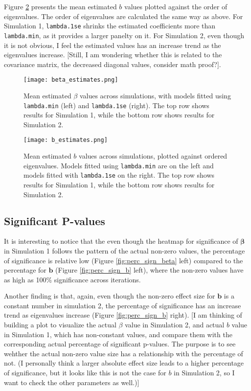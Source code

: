 \documentclass[12pt]{article}
\begin{document}
Figure \ref{fig:b_estimates} presents the mean estimated \( b \) values plotted against the order of eigenvalues. The order of eigenvalues are calculated the same way as above. For Simulation 1, \texttt{lambda.1se} shrinks the estimated coefficients more than \texttt{lambda.min}, as it provides a larger panelty on it. For Simulation 2, even though it is not obvious, I feel the estimated values has an increase trend as the eigenvalues increase. [Still, I am wondering whether this is related to the covariance matrix, the decreased diagonal values, consider math proof?].

\begin{figure}[h!]
	\centering
	\texttt{[image: beta\_estimates.png]}
	\caption{Mean estimated \( \beta \) values across simulations, with models fitted using \texttt{lambda.min} (left) and
		\texttt{lambda.1se} (right). The top row shows results for Simulation 1, while the bottom row shows results for Simulation 2.}
	\label{fig:beta_estimates}
\end{figure}

\begin{figure}[h!]
	\centering
	\texttt{[image: b\_estimates.png]}
	\caption{Mean estimated \( b \) values across simulations, plotted against ordered eigenvalues. Models fitted using
		\texttt{lambda.min} are on the left and models fitted with \texttt{lambda.1se} on the right. The top row shows results for Simulation 1, while the bottom row shows results for Simulation 2.}
	\label{fig:b_estimates}
\end{figure}

\FloatBarrier

\subsection*{Significant P-values}

It is interesting to notice that the even though the heatmap for significance of \( \boldsymbol{\beta} \) in Simulation 1 follows the pattern of the actual non-zero values, the percentage of significance is relative low (Figure \ref{fig:perc_sign_beta} left) compared to the percentage for \( \mathbf{b} \) (Figure \ref{fig:perc_sign_b} left), where the non-zero values have as high as 100\% significance across iterations.  

Another finding is that, again, even though the non-zero effect size for \( \mathbf{b} \) is a constant number in simulation 2, the percentage of significance has an increase trend as eigenvalues increase (Figure \ref{fig:perc_sign_b} right). [I am thinking of building a plot to visualize the actual \( \beta \) value in Simulation 2, and actual \( b \) value in Simulation 1, which has non-constant values, and compare them with the corresponding actual percentage of significant p-values. The purpose is to see wehther the actual non-zero value size has a relationship with the percentage of not. (I personally think a larger absolute effect size leads to a higher percentage of significance, but it looks like this is not the case for \( b \) in Simulation 2, so I want to check the other parameters as well.)]
\end{document}
